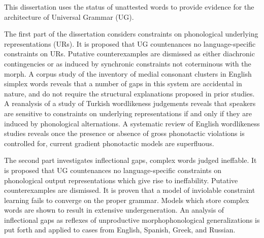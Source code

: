This dissertation uses the status of unattested words to provide evidence for the architecture of Universal Grammar (UG).

The first part of the dissertation considers constraints on phonological underlying representations (URs). 
It is proposed that UG countenances no language-specific constraints on URs. 
Putative counterexamples are dismissed as either diachronic contingencies or as induced by synchronic constraints not coterminous with the morph.
A corpus study of the inventory of medial consonant clusters in English simplex words reveals that a number of gaps in this system are accidental in nature, and do not require the structural explanations proposed in prior studies. 
A reanalysis of a study of Turkish wordlikeness judgements reveals that speakers are sensitive to constraints on underlying representations if and only if they are induced by phonological alternations.
A systematic review of English wordlikeness studies reveals once the presence or absence of gross phonotactic violations is controlled for, current gradient phonotactic models are superfluous.

The second part investigates inflectional gaps, complex words judged ineffable.
It is proposed that UG countenances no language-specific constraints on phonological output representations which give rise to ineffability. 
Putative counterexamples are dismissed.
It is proven that a model of inviolable constraint learning fails to converge on the proper grammar. 
Models which store complex words are shown to result in extensive undergeneration. 
An analysis of inflectional gaps as reflexes of unproductive morphophonological generalizations is put forth and applied to cases from English, Spanish, Greek, and Russian.
